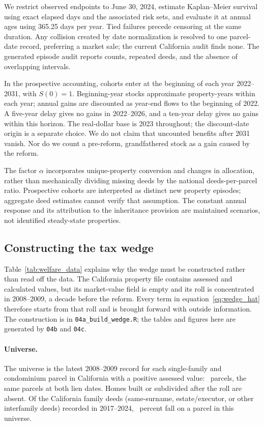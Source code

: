 We restrict observed endpoints to June 30, 2024, estimate Kaplan--Meier
survival using exact elapsed days and the associated risk sets, and evaluate
it at annual ages using 365.25 days per year. Tied failures precede censoring
at the same duration. Any collision created by date normalization is
resolved to one parcel-date record, preferring a market sale; the current
California audit finds none. The generated episode audit reports counts,
repeated deeds, and the absence of overlapping intervals.

In the prospective accounting, cohorts enter at the beginning of each year
2022--2031, with $S(0)=1$. Beginning-year stocks approximate property-years
within each year; annual gains are discounted as year-end flows to the
beginning of 2022. A five-year delay gives no gains in 2022--2026, and a
ten-year delay gives no gains within this horizon. The real-dollar base is
2023 throughout; the discount-date origin is a separate choice. We do not
claim that uncounted benefits after 2031 vanish. Nor do we count a
pre-reform, grandfathered stock as a gain caused by the reform.

The factor $\alpha$ incorporates unique-property conversion and changes in
allocation, rather than mechanically dividing missing deeds by the national
deeds-per-parcel ratio. Prospective cohorts are interpreted as distinct new
property episodes; aggregate deed estimates cannot verify that assumption.
The constant annual response and its attribution to the inheritance
provision are maintained scenarios, not identified steady-state properties.

\subsection{Constructing the tax wedge}\label{app:wedge}



Table~\ref{tab:welfare_data} explains why the wedge must be constructed
rather than read off the data. The California property file contains
assessed and calculated values, but its market-value field is empty and its
roll is concentrated in 2008--2009, a decade before the reform. Every term in
equation~\eqref{eq:wedge_hat} therefore starts from that roll and is brought
forward with outside information. The construction is in
\texttt{04a\_build\_wedge.R}; the tables and figures here are generated by
\texttt{04b} and \texttt{04c}.

\paragraph{Universe.} The universe is the latest 2008--2009 record for each
single-family and condominium parcel in California with a positive assessed
value: \WedgeParcels\ parcels, the same parcels at both lien dates. Homes
built or subdivided after the roll are absent. Of the California family
deeds (same-surname, estate/executor, or other interfamily deeds) recorded in 2017--2024,
\WedgeFamLinkage\ percent fall on a parcel in this universe.

